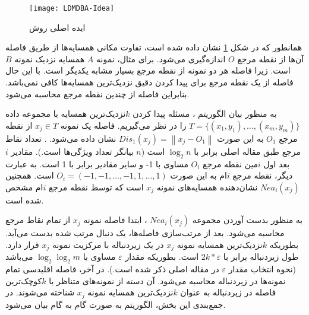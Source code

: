 \begin{figure}[!b]
	\centering
	\texttt{[image: LDMDBA-Idea]}
	\caption[ایده اصلی روش ]{ایده اصلی روش  \cite{xia2015}}
	\label{fig:LDMDBA}
\end{figure}

همانطور که در شکل  \ref{fig:LDMDBA}‏ نشان داده شده است، تفاوت مکانی همسایه‌ها از طریق فاصله آن‌ها از نقطه مرجع $O$ اندازه‌گیری می‌شود. برای مثال، نمونه  $A$ همسایه نزدیک نمونه $B$  است. زیرا فاصله هر دو نمونه از نقطه مرجع  بسیار مشابه یکدیگر است. با این حال فاصله از یک نقطه مرجع برای پیدا کردن دقیق نزدیک‌ترین همسایه‌ها کافی نمی‌باشد. بنابراین فاصله از چندین نقطه مرجع محاسبه می‌شود.

به منظور بیان الگوریتم ، مسئله پیدا کردن  $k$نزدیک‌ترین همسایه با مجموعه داده $T=\{(x_1, y_1),\dots,(x_m, y_m)\}$ را در نظر می‌گیریم. فاصله یک نمونه   $x_{j} \in T$ از نقطه مرجع $O_{1}$  به این صورت $Dis_{1}(x_{j})=\left\|x_{j}-O_{1}\right\|$  نشان داده می‌شود. . تعداد نقاط مرجع طبق مقاله اصلی \cite{xia2015} برابر با  ${{\log }_{2}}n$ است ($n$  بیانگر تعداد ویژگی‌ها است.). مقادیر $i$ بعد اول  $i$مین نقطه مرجع $O_{i}$  مساوی با 1- و سایر مقادیر برابر با 1 است. به عبارت دیگر، نقطه مرجع  $i$ام به این صورت   $O_{i}=(-1,-1,\dots,-1,1,\dots,1)$ است. همچنین $Nea_{i}(x_{j})$ نشان‌دهنده همسایه‌های نمونه $x_j$ است که توسط نقطه مرجع $i$ام مشخص شده است.

به منظور بدست آوردن مجموعه  $Nea_{i}(x_{j})$ ، ابتدا فاصله نمونه  $x_j$ از تمام نقاط مرجع محاسبه می‌شود. بعد از مرتب‌سازی فاصله‌ها، یک دنبال مرتب شده بدست می‌آید. بطوریکه $k$نزدیک‌ترین همسایه نمونه $x_j$  در یک زیردنباله با مرکزیت نمونه  $x_j$  قرار دارد. طول زیردنباله برابر با  $2k*\varepsilon$ است. بطوریکه مقدار $\varepsilon$  مساوی با  ${{\log }_{2}}{{\log }_{2}}m$ می‌باشد (نحوه انتخاب مقدار $\varepsilon$  در مقاله اصلی \cite{xia2015} ذکر شده است.).  در آخر، فاصله اقلیدسی تمام نمونه‌ها در زیردنباله محاسبه می‌شود. آن دسته از نمونه‌های متناظر با  $k$کوچک‌ترین فاصله در زیردنباله به عنوان $k$نزدیک‌ترین همسایه نمونه $x_j$ شناخته می‌شوند. در جمع‌بندی این بخش، الگوریتم  به صورت گام به گام بیان می‌شود.

